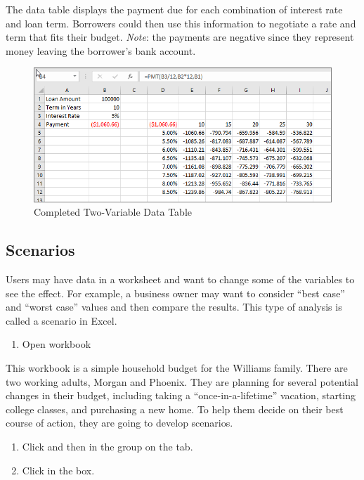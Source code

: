 The data table displays the payment due for each combination of interest rate and loan term. Borrowers could then use this information to negotiate a rate and term that fits their budget. \textit{Note}: the payments are negative since they represent money leaving the borrower's bank account.

\begin{figure}[H]
	\centering
	\includegraphics[width=\maxwidth{.95\linewidth}]{gfx/ch08_fig22}
	\caption{Completed Two-Variable Data Table}
	\label{08:fig22}
\end{figure}

\subsection{Scenarios}

Users may have data in a worksheet and want to change some of the variables to see the effect. For example, a business owner may want to consider ``best case'' and ``worst case'' values and then compare the results. This type of analysis is called a scenario in Excel.

\begin{enumerate}
	\item Open workbook 
\end{enumerate}

This workbook is a simple household budget for the Williams family. There are two working adults, Morgan and Phoenix. They are planning for several potential changes in their budget, including taking a ``once-in-a-lifetime'' vacation, starting college classes, and purchasing a new home. To help them decide on their best course of action, they are going to develop scenarios.

\begin{enumerate}[resume]
	\item Click  and then  in the  group on the  tab.
	\item Click  in the  box.
\end{enumerate}

